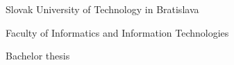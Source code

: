 \begin{center}
\thispagestyle{empty}
{\Large Slovak University of Technology in Bratislava}
\par\end{center}{\Large \par}

\begin{center}
{\Large Faculty of Informatics and Information Technologies}
\par\end{center}{\Large \par}

\smallskip{}

\begin{center}
\myEvidenceNumber
\par\end{center}
\vfill{}

\begin{center}
\textbf{\Large \myName}
\par\end{center}{\Large \par}

\medskip{}


\begin{center}
\textbf{\LARGE \myTitle }
\par\end{center}{\huge \par}

\medskip{}


\begin{center}

{\Large Bachelor thesis}
\par\end{center}{\Large \par}

\vfill{}
